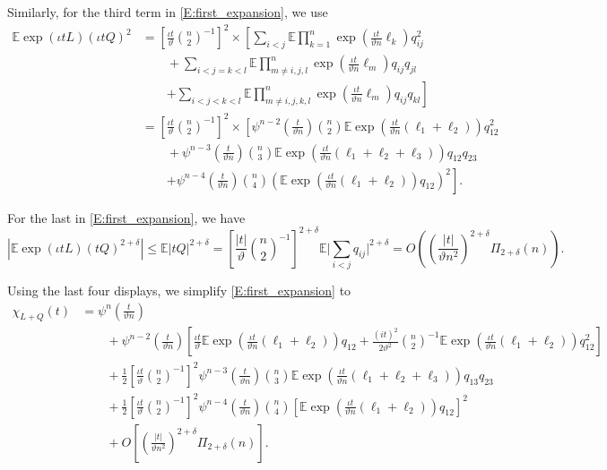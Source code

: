 \documentclass[11pt]{article}
\numberwithin{equation}{section}
\theoremstyle{definition}
\newcommand{\E}{\mathbb{E}}
\newcommand{\Scale}{\vartheta}
\begin{document}
Similarly, for the third term in \eqref{E:first_expansion}, we use
\begin{align*}
\E\exp (\iota tL)(\iota tQ)^2 &= \left[\frac{\iota t}{\Scale}\binom{n}{2}^{-1}\right]^{2}\times\left[\sum_{i<j}\E\prod_{k=1}^n\exp \left(\frac{\iota t}{\Scale n}\ell_k\right)q_{ij}^2\right. \\
&\qquad +\sum_{i<j=k<l}\E\prod_{m\neq i,j,l}^n\exp \left(\frac{\iota t}{\Scale n}\ell_m\right)q_{ij}q_{jl}\\
&\qquad  \left.+\sum_{i<j<k<l}\E\prod_{m\neq i,j,k,l}^n\exp \left(\frac{\iota t}{\Scale n}\ell_m\right)q_{ij}q_{kl}\right]\\
&= \left[\frac{\iota t}{\Scale}\binom{n}{2}^{-1}\right]^{2}\times\left[\psi^{n-2}\left(\tfrac{t}{\Scale n}\right)\binom{n}{2}\E\exp\left(\frac{\iota t}{\Scale n}(\ell_1 +\ell_2)\right)q_{12}^2\right.\\
&\qquad +\psi^{n-3}\left(\tfrac{t}{\Scale n}\right)\binom{n}{3}\E\exp\left(\frac{\iota t}{\Scale n}(\ell_1 +\ell_2+\ell_3)\right)q_{12}q_{23}\\
&\qquad  \left.+\psi^{n-4}\left(\tfrac{t}{\Scale n}\right)\binom{n}{4}\left(\E\exp\left(\frac{\iota t}{\Scale n}(\ell_1 +\ell_2)\right)q_{12}\right)^2\right].
\end{align*}

For the last in \eqref{E:first_expansion}, we have
\[|\E\exp (\iota tL)(tQ)^{2+\delta}|\leq \E|tQ|^{2+\delta}
  = \left[\frac{|t|}{\Scale}\binom{n}{2}^{-1}\right]^{2+\delta}\E\Big|\sum_{i<j}q_{ij} \Big|^{2+\delta}
  = O\left( \left(\frac{|t|}{\Scale n^2}\right)^{2+\delta}\Pi_{2+\delta}(n)\right).
\]

Using the last four displays, we simplify \eqref{E:first_expansion} to
\begin{align}\label{E:second_expansion}
\chi_{L+Q}(t) &= \psi^n\left(\tfrac{t}{\Scale n}\right) \nonumber\\
&\qquad +\psi^{n-2}\left(\tfrac{t}{\Scale n}\right)\left[\frac{\iota t}{\Scale}\E \exp(\tfrac{\iota t}{\Scale n}(\ell_1+\ell_2))q_{12} +\frac{(it)^2}{2\Scale^2} \binom{n}{2}^{-1}\E \exp(\tfrac{\iota t}{\Scale n}(\ell_1+\ell_2))q_{12}^ 2\right] \nonumber\\
&\qquad + \tfrac{1}{2}\left[\tfrac{\iota t}{\Scale}\binom{n}{2}^{-1}\right]^{2}\psi^{n-3}\left(\tfrac{t}{\Scale n}\right)\binom{n}{3}\E \exp(\tfrac{\iota t}{\Scale n}(\ell_1+\ell_2+\ell_3))q_{13}q_{23} \nonumber\\
&\qquad + \tfrac{1}{2}\left[\tfrac{\iota t}{\Scale}\binom{n}{2}^{-1}\right]^{2}\psi^{n-4}\left(\tfrac{t}{\Scale n}\right)\binom{n}{4} \left[\E \exp(\tfrac{\iota t}{\Scale n}(\ell_1+\ell_2))q_{12}\right]^ 2 \nonumber\\
&\qquad  +  O\left[ \left(\tfrac{|t|}{\Scale n^2}\right)^{2+\delta}\Pi_{2+\delta}(n)\right].
\end{align}
\end{document}
